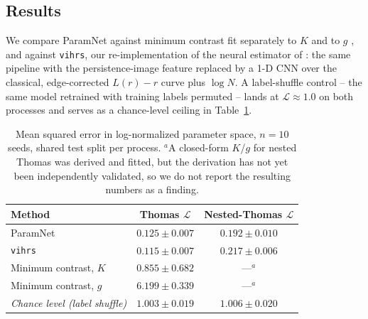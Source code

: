\documentclass[11pt,a4paper]{article}
\theoremstyle{definitioncolon}
\begin{document}
\subsection{Results}
\label{paramnet:sec-results}

We compare ParamNet against minimum contrast fit separately to $K$ and to
$g$ \citep{diggle2003spatial}, and against \texttt{vihrs}, our
re-implementation of the neural estimator of \citet{vihrs2022neural}: the
same pipeline with the persistence-image feature replaced by a 1-D CNN over
the classical, edge-corrected $L(r)-r$ curve plus $\log N$. A label-shuffle
control -- the same model retrained with training labels permuted -- lands
at $\mathcal{L}\approx1.0$ on both processes and serves as a chance-level
ceiling in Table~\ref{paramnet:tab-comparison}.

\begin{table}[tbp]
\centering
\small
\begin{tabular}{lcc}
\toprule
Method & Thomas $\mathcal{L}$ & Nested-Thomas $\mathcal{L}$ \\
\midrule
ParamNet                & $0.125 \pm 0.007$ & $0.192 \pm 0.010$ \\
\texttt{vihrs}           & $0.115 \pm 0.007$ & $0.217 \pm 0.006$ \\
Minimum contrast, $K$    & $0.855 \pm 0.682$ & ---$^{a}$ \\
Minimum contrast, $g$    & $6.199 \pm 0.339$ & ---$^{a}$ \\
\midrule
\emph{Chance level (label shuffle)} & \emph{$1.003 \pm 0.019$} & \emph{$1.006 \pm 0.020$} \\
\bottomrule
\end{tabular}
\caption{Mean squared error in log-normalized parameter space, $n=10$ seeds,
shared test split per process. $^{a}$A closed-form $K$/$g$ for nested Thomas
was derived and fitted, but the derivation has not yet been independently
validated, so we do not report the resulting numbers as a finding.}
\label{paramnet:tab-comparison}
\end{table}
\end{document}
